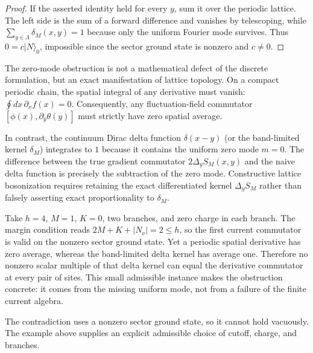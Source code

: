 \begin{proof}
If the asserted identity held for every $y$, sum it over the periodic lattice. The left side is the sum of a forward difference and vanishes by telescoping, while $\sum_{y\in\Lambda}\delta_M(x,y)=1$ because only the uniform Fourier mode survives. Thus $0=c|N\rangle_0$, impossible since the sector ground state is nonzero and $c\ne0$.
\end{proof}

\begin{remark}
\label{rem:zero_mode_significance}
The zero-mode obstruction is not a mathematical defect of the discrete formulation, but an exact manifestation of lattice topology. On a compact periodic chain, the spatial integral of any derivative must vanish: $\oint dx\, \partial_x f(x) = 0$. Consequently, any fluctuation-field commutator $[\phi(x), \partial_y \theta(y)]$ must strictly have zero spatial average.

In contrast, the continuum Dirac delta function $\delta(x - y)$ (or the band-limited kernel $\delta_M$) integrates to $1$ because it contains the uniform zero mode $m = 0$. The difference between the true gradient commutator $2\Delta_y S_M(x, y)$ and the naive delta function is precisely the subtraction of the zero mode. Constructive lattice bosonization requires retaining the exact differentiated kernel $\Delta_y S_M$ rather than falsely asserting exact proportionality to $\delta_M$.
\end{remark}

\begin{example}
Take $h=4$, $M=1$, $K=0$, two branches, and zero charge in each branch. The margin condition reads $2M+K+|N_\nu|=2\le h$, so the first current commutator is valid on the nonzero sector ground state. Yet a periodic spatial derivative has zero average, whereas the band-limited delta kernel has average one. Therefore no nonzero scalar multiple of that delta kernel can equal the derivative commutator at every pair of sites. This small admissible instance makes the obstruction concrete: it comes from the missing uniform mode, not from a failure of the finite current algebra.
\end{example}

\begin{remark}
The contradiction uses a nonzero sector ground state, so it cannot hold vacuously. The example above supplies an explicit admissible choice of cutoff, charge, and branches.
\end{remark}

